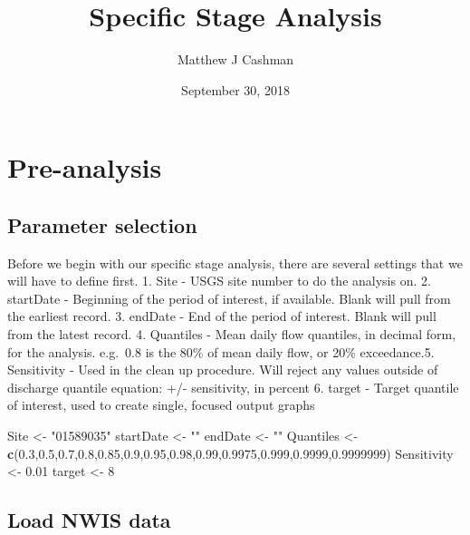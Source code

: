 \documentclass[]{article}
\title{Specific Stage Analysis}
\author{Matthew J Cashman}
\date{September 30, 2018}
\newenvironment{Shaded}{\begin{snugshade}}{\end{snugshade}}
\newcommand{\KeywordTok}[1]{\textcolor[rgb]{0.13,0.29,0.53}{\textbf{#1}}}
\newcommand{\DecValTok}[1]{\textcolor[rgb]{0.00,0.00,0.81}{#1}}
\newcommand{\FloatTok}[1]{\textcolor[rgb]{0.00,0.00,0.81}{#1}}
\newcommand{\StringTok}[1]{\textcolor[rgb]{0.31,0.60,0.02}{#1}}
\newcommand{\NormalTok}[1]{#1}
\begin{document}
\maketitle

\section{Pre-analysis}\label{pre-analysis}

\subsection{Parameter selection}\label{parameter-selection}

Before we begin with our specific stage analysis, there are several
settings that we will have to define first. 1. Site - USGS site number
to do the analysis on. 2. startDate - Beginning of the period of
interest, if available. Blank will pull from the earliest record. 3.
endDate - End of the period of interest. Blank will pull from the latest
record. 4. Quantiles - Mean daily flow quantiles, in decimal form, for
the analysis. e.g.~0.8 is the 80\% of mean daily flow, or 20\%
exceedance.5. Sensitivity - Used in the clean up procedure. Will reject
any values outside of discharge quantile equation: +/- sensitivity, in
percent 6. target - Target quantile of interest, used to create single,
focused output graphs

\begin{Shaded}
\begin{Highlighting}[]
\NormalTok{Site <-}\StringTok{ "01589035"}
\NormalTok{startDate <-}\StringTok{ ""}
\NormalTok{endDate <-}\StringTok{ ""}
\NormalTok{Quantiles <-}\StringTok{ }\KeywordTok{c}\NormalTok{(}\FloatTok{0.3}\NormalTok{,}\FloatTok{0.5}\NormalTok{,}\FloatTok{0.7}\NormalTok{,}\FloatTok{0.8}\NormalTok{,}\FloatTok{0.85}\NormalTok{,}\FloatTok{0.9}\NormalTok{,}\FloatTok{0.95}\NormalTok{,}\FloatTok{0.98}\NormalTok{,}\FloatTok{0.99}\NormalTok{,}\FloatTok{0.9975}\NormalTok{,}\FloatTok{0.999}\NormalTok{,}\FloatTok{0.9999}\NormalTok{,}\FloatTok{0.9999999}\NormalTok{)}
\NormalTok{Sensitivity <-}\StringTok{ }\FloatTok{0.01}
\NormalTok{target <-}\StringTok{ }\DecValTok{8}
\end{Highlighting}
\end{Shaded}

\subsection{Load NWIS data}\label{load-nwis-data}
\end{document}

